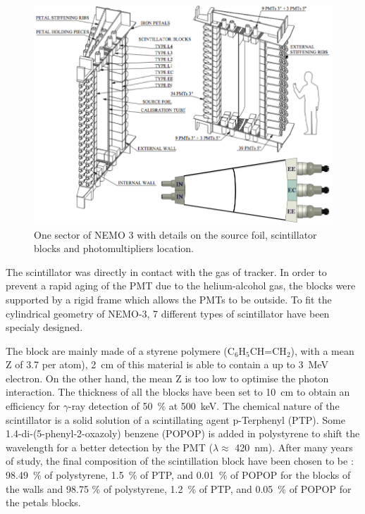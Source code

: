 \documentclass[main.tex]{subfiles}
\begin{document}
\smallskip


\begin{figure}[h!]
\begin{center}
\includegraphics[scale=0.34]{pictures/Chap3/SectorDetailedPMTconfig.png}
\caption{One sector of NEMO 3 with details on the source foil, scintillator blocks and photomultipliers location.}
\label{SectorDetailedPMTconfig}
\end{center}
\end{figure}


\NI The scintillator was directly in contact with the gas of tracker. In order to prevent a rapid aging of the PMT due to the helium-alcohol gas, the blocks were supported by a rigid frame which allows the PMTs to be outside. To fit the cylindrical geometry of NEMO-3, 7 different types of scintillator have been specialy designed. 


\bigskip


\NI The block are mainly made of a styrene polymere (C$_\text{6}$H$_\text{5}$CH=CH$_\text{2}$), with a mean Z of 3.7 per atom), 2~cm of this material is able to contain a up to 3~MeV electron. On the other hand, the mean Z is too low to optimise the photon interaction. The thickness of all the blocks have been set to 10~cm to obtain an efficiency for $\gamma$-ray detection of 50~\% at 500~keV. The chemical nature of the scintillator is a solid solution of a scintillating agent p-Terphenyl (PTP). Some 1.4-di-(5-phenyl-2-oxazoly) benzene (POPOP) is added in polystyrene to shift the wavelength for a better detection by the PMT ($\lambda \approx$ 420~nm). After many years of study, the final composition of the scintillation block have been chosen to be : 98.49~\% of polystyrene, 1.5~\% of PTP, and 0.01~\% of POPOP for the blocks of the walls and 98.75 \% of polystyrene, 1.2~\% of PTP, and 0.05~\% of POPOP for the petals blocks.
\end{document}

